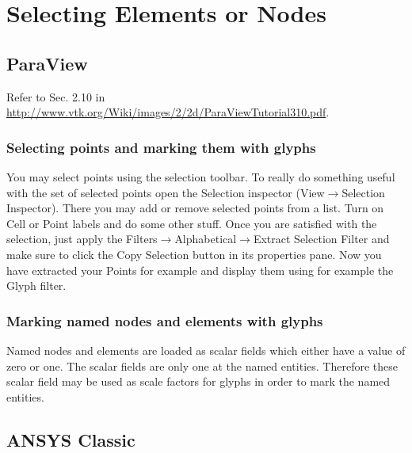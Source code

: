\section{Selecting Elements or Nodes}

\subsection{ParaView}
\label{sec:selection_pv}

Refer               to                Sec.               2.10               in
\url{http://www.vtk.org/Wiki/images/2/2d/ParaViewTutorial310.pdf}.

\subsubsection{Selecting points and marking them with glyphs}

You may  select points using  the selection  toolbar.  To really  do something
useful  with  the  set  of   selected  points  open  the  Selection  inspector
(View$\rightarrow$Selection Inspector).  There you may add  or remove selected
points from  a list.  Turn on  Cell or Point  labels and do some  other stuff.
Once   you    are   satisfied   with    the   selection,   just    apply   the
Filters$\rightarrow$Alphabetical$\rightarrow$Extract Selection Filter and make
sure to click the Copy Selection button  in its properties pane.  Now you have
extracted your Points for example and display them using for example the Glyph
filter.

\subsubsection{Marking named nodes and elements with glyphs}

Named nodes and elements are loaded as scalar fields which either have a value
of   zero  or   one.  The   scalar   fields  are   only  one   at  the   named
entities. Therefore these scalar field may be used as scale factors for glyphs
in order to mark the named entities.


\subsection{ANSYS Classic}

